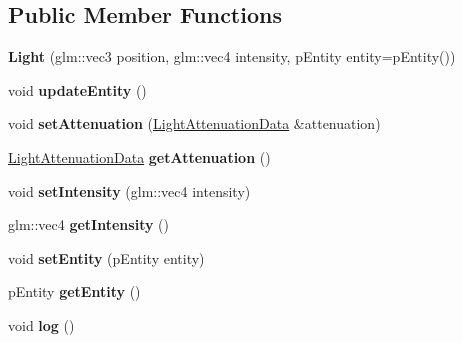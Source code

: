 \subsection*{Public Member Functions}
\begin{DoxyCompactItemize}
\item 
\hypertarget{classfillwave_1_1space_1_1Light_a9c573c7a265fe319b180f5391cb00f3d}{}{\bfseries Light} (glm\+::vec3 position, glm\+::vec4 intensity, p\+Entity entity=p\+Entity())\label{classfillwave_1_1space_1_1Light_a9c573c7a265fe319b180f5391cb00f3d}

\item 
\hypertarget{classfillwave_1_1space_1_1Light_a71ca1937ed077045d9391ecabd592bcc}{}void {\bfseries update\+Entity} ()\label{classfillwave_1_1space_1_1Light_a71ca1937ed077045d9391ecabd592bcc}

\item 
\hypertarget{classfillwave_1_1space_1_1Light_a691880b4aae4e500eec7ca737dc1cce1}{}void {\bfseries set\+Attenuation} (\hyperlink{structfillwave_1_1space_1_1LightAttenuationData}{Light\+Attenuation\+Data} \&attenuation)\label{classfillwave_1_1space_1_1Light_a691880b4aae4e500eec7ca737dc1cce1}

\item 
\hypertarget{classfillwave_1_1space_1_1Light_abdaf623ab7a8ef8bddcba0a9e2440056}{}\hyperlink{structfillwave_1_1space_1_1LightAttenuationData}{Light\+Attenuation\+Data} {\bfseries get\+Attenuation} ()\label{classfillwave_1_1space_1_1Light_abdaf623ab7a8ef8bddcba0a9e2440056}

\item 
\hypertarget{classfillwave_1_1space_1_1Light_a7a7f79ec59bd6244811e0947bee4f3bc}{}void {\bfseries set\+Intensity} (glm\+::vec4 intensity)\label{classfillwave_1_1space_1_1Light_a7a7f79ec59bd6244811e0947bee4f3bc}

\item 
\hypertarget{classfillwave_1_1space_1_1Light_a2ca35e03003c95beaf607b84ed5e3c12}{}glm\+::vec4 {\bfseries get\+Intensity} ()\label{classfillwave_1_1space_1_1Light_a2ca35e03003c95beaf607b84ed5e3c12}

\item 
\hypertarget{classfillwave_1_1space_1_1Light_a5481eadd75b7a7725fba3fa062b73cf1}{}void {\bfseries set\+Entity} (p\+Entity entity)\label{classfillwave_1_1space_1_1Light_a5481eadd75b7a7725fba3fa062b73cf1}

\item 
\hypertarget{classfillwave_1_1space_1_1Light_aed87256495746c7b4a8e6c57474beaad}{}p\+Entity {\bfseries get\+Entity} ()\label{classfillwave_1_1space_1_1Light_aed87256495746c7b4a8e6c57474beaad}

\item 
\hypertarget{classfillwave_1_1space_1_1Light_a8a756bffdd299cd6bc2bfcc7f98fb230}{}void {\bfseries log} ()\label{classfillwave_1_1space_1_1Light_a8a756bffdd299cd6bc2bfcc7f98fb230}

\end{DoxyCompactItemize}
